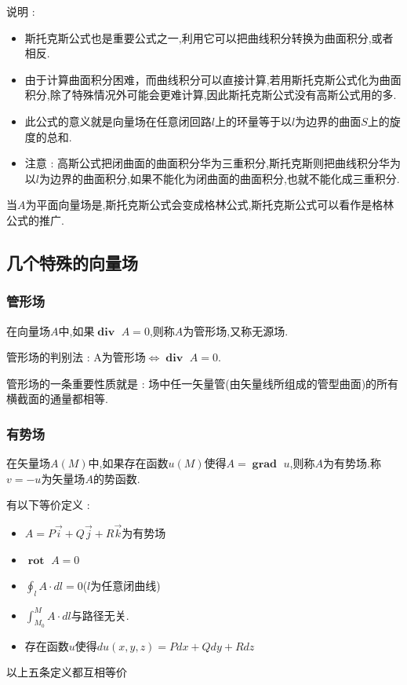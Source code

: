 \documentclass[UTF8,12pt]{ctexbook}
\newcommand{\definiteIntegral}[2]{\int^{#1}_{#2}}
\newcommand{\curveIntegralOnLine}[1]{\oint_{#1}}
\DeclareMathOperator{\divergenceText}{\mathbf{div}\ }
\DeclareMathOperator{\curlRotText}{\mathbf{rot}\ }
\DeclareMathOperator{\gradText}{\mathbf{grad}\ }
\begin{document}
{{{{{      说明 :
      \begin{itemize}
        \item 斯托克斯公式也是重要公式之一,利用它可以把曲线积分转换为曲面积分,或者相反.
        \item 由于计算曲面积分困难，而曲线积分可以直接计算,若用斯托克斯公式化为曲面积分,除了特殊情况外可能会更难计算,因此斯托克斯公式没有高斯公式用的多.
        \item 此公式的意义就是向量场在任意闭回路$l$上的环量等于以$l$为边界的曲面$S$上的旋度的总和.
        \item 注意 : 高斯公式把闭曲面的曲面积分华为三重积分,斯托克斯则把曲线积分华为以$l$为边界的曲面积分,如果不能化为闭曲面的曲面积分,也就不能化成三重积分.
      \end{itemize}

      当$A$为平面向量场是,斯托克斯公式会变成格林公式,斯托克斯公式可以看作是格林公式的推广.
    }%

  }%

  \subsection{几个特殊的向量场}{

    \subsubsection{管形场}{
      在向量场$A$中,如果$\divergenceText A = 0$,则称$A$为管形场,又称无源场.

      管形场的判别法 : A为管形场$\Leftrightarrow \divergenceText A = 0$.

      管形场的一条重要性质就是 : 场中任一矢量管(由矢量线所组成的管型曲面)的所有横截面的通量都相等.
    }%

    \subsubsection{有势场}{
      在矢量场$A(M)$中,如果存在函数$u(M)$使得$A = \gradText u$,则称$A$为有势场.称$v = -u$为矢量场$A$的势函数.

      有以下等价定义 :
      \begin{itemize}
        \item $A = P\vec{i} + Q\vec{j} + R\vec{k}$为有势场
        \item $\curlRotText A = 0$
        \item $\curveIntegralOnLine{l} A \cdot dl = 0$($l$为任意闭曲线)
        \item $\definiteIntegral{M}{M_0}A \cdot dl$与路径无关.
        \item 存在函数$u$使得$du(x,y,z) = Pdx + Qdy + Rdz$
      \end{itemize}
      以上五条定义都互相等价

}}}}}
\end{document}

